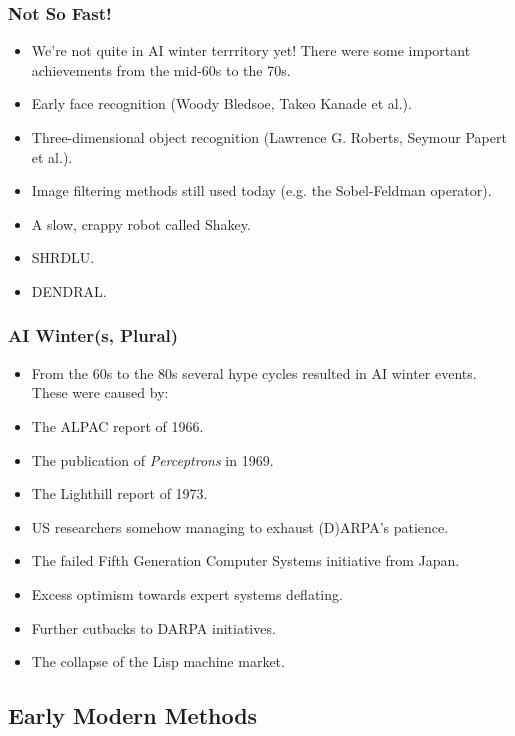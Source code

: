 \documentclass[10pt]{beamer}
\begin{document}
  \begin{frame}
    \frametitle{Not So Fast!}

    \begin{itemize}
      \item We're not quite in AI winter terrritory yet! There were some
        important achievements from the mid-60s to the 70s.
      \pause
      \item Early face recognition (Woody Bledsoe, Takeo Kanade et al.).
      \pause
      \item Three-dimensional object recognition (Lawrence G. Roberts, Seymour
        Papert et al.).
      \pause
      \item Image filtering methods still used today (e.g. the Sobel-Feldman
        operator).
      \pause
      \item A slow, crappy robot called Shakey.
      \pause
      \item SHRDLU.
      \pause
      \item DENDRAL.
    \end{itemize}
  \end{frame}

  \begin{frame}
    \frametitle{AI Winter(s, Plural)}

    \begin{itemize}
      \item From the 60s to the 80s several hype cycles resulted in AI winter
        events. These were caused by:
      \pause
      \item The ALPAC report of 1966.
      \pause
      \item The publication of \textit{Perceptrons} in 1969.
      \pause
      \item The Lighthill report of 1973.
      \pause
      \item US researchers somehow managing to exhaust (D)ARPA's patience.
      \pause
      \item The failed Fifth Generation Computer Systems initiative from
        Japan.
      \pause
      \item Excess optimism towards expert systems deflating.
      \pause
      \item Further cutbacks to DARPA initiatives.
      \pause
      \item The collapse of the Lisp machine market.
    \end{itemize}
  \end{frame}

  \subsection{Early Modern Methods}
\end{document}
